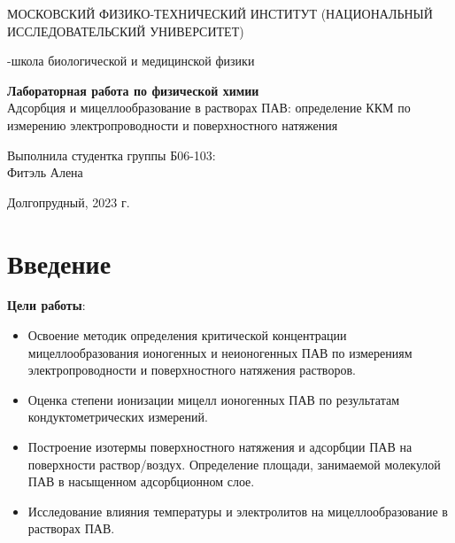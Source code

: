 \documentclass[a4paper,12pt]{article}
\begin{document}
\def\figurename{Рисунок}
\begin{titlepage}
\begin{center}
    {\large МОСКОВСКИЙ ФИЗИКО-ТЕХНИЧЕСКИЙ ИНСТИТУТ (НАЦИОНАЛЬНЫЙ ИССЛЕДОВАТЕЛЬСКИЙ УНИВЕРСИТЕТ)}
\end{center}
\begin{center}
    {-школа биологической и медицинской физики}
\end{center}

\vspace{1cm}
{\huge
\begin{center}
    {\bf Лабораторная работа по физической химии}\\
    \vspace{0.5cm}
    Адсорбция и мицеллообразование в растворах ПАВ: определение ККМ по измерению электропроводности и поверхностного натяжения
\end{center}
}

\vspace{4cm}
\begin{flushright}
{\LARGE Выполнила студентка группы Б06-103:\\ Фитэль Алена \\}

\end{flushright}
\vspace{9cm}
\begin{center}
    Долгопрудный, 2023 г.
\end{center}
\end{titlepage}
\newpage
\newpage
\section{Введение}
\setcounter{page}{2}
\textbf{Цели работы}: 
\begin{itemize}
    \item Освоение методик определения критической концентрации мицеллообразования
ионогенных и неионогенных ПАВ по измерениям электропроводности и
поверхностного натяжения растворов.
    \item Оценка степени ионизации мицелл ионогенных ПАВ по результатам
кондуктометрических измерений.
    \item Построение изотермы поверхностного натяжения и адсорбции ПАВ на поверхности
раствор/воздух. Определение площади, занимаемой молекулой ПАВ в насыщенном
адсорбционном слое.
    \item Исследование влияния температуры и электролитов на мицеллообразование в
растворах ПАВ.
\end{itemize}
\end{document}
